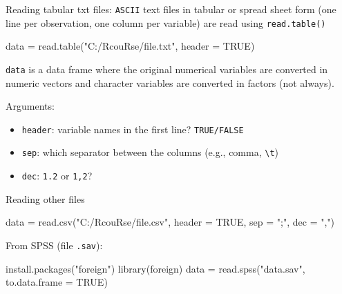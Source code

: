 \documentclass[
  ignorenonframetext,
]{beamer}
\newenvironment{Shaded}{\begin{snugshade}}{\end{snugshade}}
\newcommand{\AttributeTok}[1]{\textcolor[rgb]{0.00,0.34,0.68}{#1}}
\newcommand{\ConstantTok}[1]{\textcolor[rgb]{0.67,0.33,0.00}{#1}}
\newcommand{\FunctionTok}[1]{\textcolor[rgb]{0.39,0.29,0.61}{#1}}
\newcommand{\NormalTok}[1]{\textcolor[rgb]{0.12,0.11,0.11}{#1}}
\newcommand{\OtherTok}[1]{\textcolor[rgb]{0.00,0.43,0.16}{#1}}
\newcommand{\StringTok}[1]{\textcolor[rgb]{0.75,0.01,0.01}{#1}}
\providecommand{\tightlist}{%
  \setlength{\itemsep}{0pt}\setlength{\parskip}{0pt}}
\begin{document}
\begin{frame}[fragile]{Reading tabular txt files:}
\protect\hypertarget{reading-tabular-txt-files}{}
\texttt{ASCII} text files in tabular or spread sheet form (one line per
observation, one column per variable) are read using
\texttt{read.table()}

\begin{Shaded}
\begin{Highlighting}[]
\NormalTok{data }\OtherTok{=} \FunctionTok{read.table}\NormalTok{(}\StringTok{"C:/RcouRse/file.txt"}\NormalTok{, }\AttributeTok{header =} \ConstantTok{TRUE}\NormalTok{)}
\end{Highlighting}
\end{Shaded}

\texttt{data} is a data frame where the original numerical variables are
converted in numeric vectors and character variables are converted in
factors (not always).

Arguments:

\begin{itemize}
\tightlist
\item
  \texttt{header}: variable names in the first line? \texttt{TRUE/FALSE}
\item
  \texttt{sep}: which separator between the columns (e.g., comma,
  \texttt{\textbackslash{}t})
\item
  \texttt{dec}: \texttt{1.2} or \texttt{1,2}?
\end{itemize}
\end{frame}

\begin{frame}[fragile]{Reading other files}
\protect\hypertarget{reading-other-files}{}
\begin{Shaded}
\begin{Highlighting}[]
\NormalTok{data }\OtherTok{=} \FunctionTok{read.csv}\NormalTok{(}\StringTok{"C:/RcouRse/file.csv"}\NormalTok{, }
                \AttributeTok{header =} \ConstantTok{TRUE}\NormalTok{, }\AttributeTok{sep =} \StringTok{";"}\NormalTok{, }
                \AttributeTok{dec =} \StringTok{","}\NormalTok{)}
\end{Highlighting}
\end{Shaded}

From SPSS (file \texttt{.sav}):

\begin{Shaded}
\begin{Highlighting}[]
\FunctionTok{install.packages}\NormalTok{(}\StringTok{"foreign"}\NormalTok{)}
\FunctionTok{library}\NormalTok{(foreign)}
\NormalTok{data }\OtherTok{=} \FunctionTok{read.spss}\NormalTok{(}\StringTok{"data.sav"}\NormalTok{, }\AttributeTok{to.data.frame =} \ConstantTok{TRUE}\NormalTok{)}
\end{Highlighting}
\end{Shaded}
\end{frame}
\end{document}
